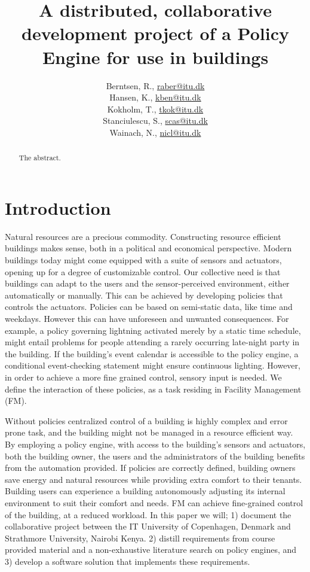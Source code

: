 \documentclass[11pt]{report}
\title{A distributed, collaborative development project of a Policy Engine for use in buildings\\\scalebox{0.85}{Global Software Development}}
\author{Berntsen, R., \url{raber@itu.dk}\\Hansen, K., \url{kben@itu.dk}\\Kokholm, T., \url{tkok@itu.dk}\\Stanciulescu, S., \url{scas@itu.dk}\\Wainach, N., \url{nicl@itu.dk}}
\begin{document}
\maketitle
\begin{abstract}
The abstract.
\end{abstract}
\tableofcontents


\chapter{Introduction}
Natural resources are a precious commodity. Constructing resource efficient buildings makes sense, both in a political and economical perspective. Modern buildings today might come equipped with a suite of sensors and actuators, opening up for a degree of customizable control. Our collective need is that buildings can adapt to the users and the sensor-perceived environment, either automatically or manually. This can be achieved by developing policies that controls the actuators. Policies can be based on semi-static data, like time and weekdays. However this can have unforeseen and unwanted consequences. For example, a policy governing lightning activated merely by a static time schedule, might entail problems for people attending a rarely occurring late-night party in the building. If the building’s event calendar is accessible to the policy engine, a conditional event-checking statement might ensure continuous lighting. However, in order to achieve a more fine grained control, sensory input is needed. We define the interaction of these policies, as a task residing in Facility Management (FM). 

Without policies centralized control of a building is highly complex and error prone task, and the building might not be managed in a resource efficient way. By employing a policy engine, with access to the building’s sensors and actuators, both the building owner, the users and the administrators of the building benefits from the automation provided. If policies are correctly defined, building owners save energy and natural resources while providing extra comfort to their tenants. Building users can experience a building autonomously adjusting its internal environment to suit their comfort and needs. FM can achieve fine-grained control of the building, at a reduced workload. 
\newpage
In this paper we will; 1) document the collaborative project between the IT University of Copenhagen, Denmark and Strathmore University, Nairobi Kenya. 2) distill requirements from course provided material and a non-exhaustive literature search on policy engines, and 3) develop a software solution that implements these requirements.
\end{document}
